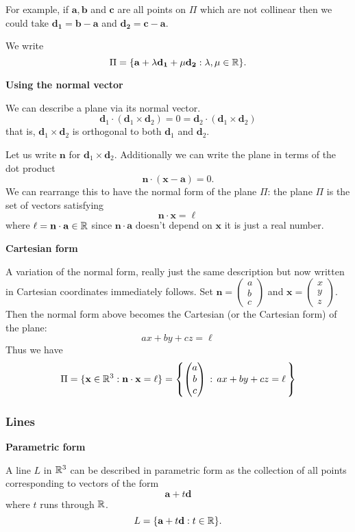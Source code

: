 \documentclass[10pt, a4paper]{article}
\newcommand{\mbf}[1]{\mathbf{#1}}
\begin{document}
For example, if $\mbf{a, b}$ and $\mbf{c}$ are all points on $\Pi$ which are not collinear then we could take $\mbf{d_1 = b - a}$ and $\mbf{d_2 = c - a}$.

We write
\[
\Pi = \{\mbf{a} + \lambda\mbf{d_1} + \mu\mbf{d_2} : \lambda, \mu \in \R\}.
\]

\textbf{Using the normal vector}

We can describe a plane via its normal vector.
\[
\mbf{d}_1 \cdot (\mbf{d}_1 \times \mbf{d}_2) = 0 = \mbf{d}_2 \cdot (\mbf{d}_1 \times \mbf{d}_2)
\]
that is, $\mbf{d}_1 \times \mbf{d}_2$ is orthogonal to both $\mbf{d}_1$ and $\mbf{d}_2$.

Let us write $\mbf{n}$ for $\mbf{d}_1 \times \mbf{d}_2$. Additionally we can write the plane in terms of the dot product
\[
\mbf{n \cdot(x - a)} = 0.
\]
We can rearrange this to have the normal form of the plane $\Pi$: the plane $\Pi$ is the set of vectors satisfying
\[
\mbf{n \cdot x} = \ell
\]
where $\ell = \mbf{n \cdot a} \in \R$ since $\mbf{n \cdot a}$ doesn't depend on $\mbf{x}$ it is just a real number.


\textbf{Cartesian form}

A variation of the normal form, really just the same description but now written in Cartesian coordinates immediately follows. Set $\mbf{n} = \begin{pmatrix} a \\ b \\ c \end{pmatrix}$ and $\mbf{x} = \begin{pmatrix} x \\ y \\ z \end{pmatrix}$. Then the normal form above becomes the Cartesian (or the Cartesian form) of the plane:
\[
ax + by + cz = \ell
\]
Thus we have
\[
\Pi = \{\mbf{x} \in \R ^ 3 : \mbf{n \cdot x} = \ell\} = \left\{\begin{pmatrix} a \\ b \\ c \end{pmatrix}\,:\,ax + by + cz = \ell\,\right\}
\]

\subsubsection{Lines}
\textbf{Parametric form}

A line $L$ in $\mathbb{R} ^ 3$ can be described in parametric form as the collection of all points corresponding to vectors of the form
\[
\mbf{a} + t\mbf{d}
\]
where $t$ runs through $\mathbb{R}$.
\[
L = \{\mbf{a} + t\mbf{d} : t \in \R\}.
\]
\end{document}
